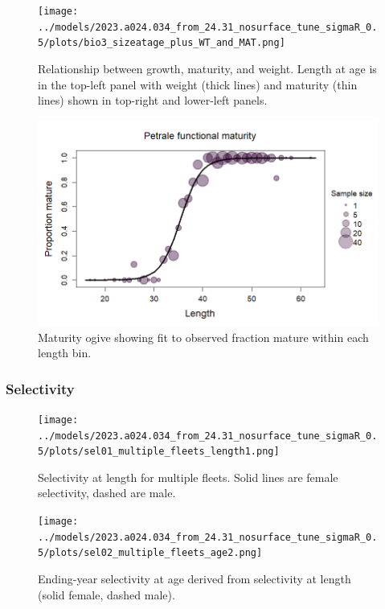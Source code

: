 \documentclass[11pt,
  english,
  letterpaper,
]{article}
\begin{document}
\begin{figure}
\centering
\texttt{[image: ../models/2023.a024.034\_from\_24.31\_nosurface\_tune\_sigmaR\_0.5/plots/bio3\_sizeatage\_plus\_WT\_and\_MAT.png]}
\caption{Relationship between growth, maturity, and weight. Length at age is in the top-left panel with weight (thick lines) and maturity (thin lines) shown in top-right and lower-left panels.\label{fig:mod-est-len-age2}}
\end{figure}

\begin{figure}
\centering
\includegraphics[width=1\textwidth,height=1\textheight]{../figures/Petrale_fxn_ogive.png}
\caption{Maturity ogive showing fit to observed fraction mature within each length bin.\label{fig:maturity}}
\end{figure}

\hypertarget{selectivity}{%
\subsubsection{Selectivity}\label{selectivity}}

\begin{figure}
\centering
\texttt{[image: ../models/2023.a024.034\_from\_24.31\_nosurface\_tune\_sigmaR\_0.5/plots/sel01\_multiple\_fleets\_length1.png]}
\caption{Selectivity at length for multiple fleets. Solid lines are female selectivity, dashed are male.\label{fig:sel_length}}
\end{figure}

\begin{figure}
\centering
\texttt{[image: ../models/2023.a024.034\_from\_24.31\_nosurface\_tune\_sigmaR\_0.5/plots/sel02\_multiple\_fleets\_age2.png]}
\caption{Ending-year selectivity at age derived from selectivity at length (solid female, dashed male).\label{fig:sel-age}}
\end{figure}
\end{document}
